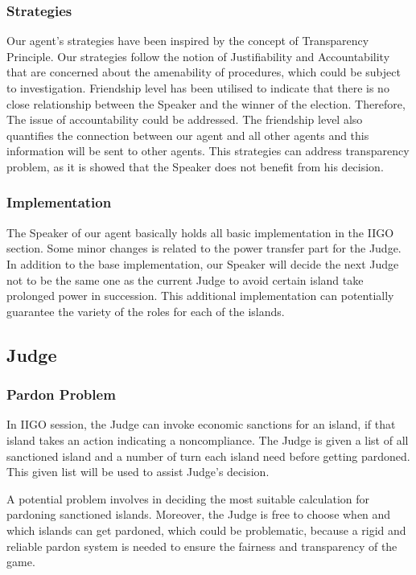 \subsubsection{Strategies} \label{subsubsec:Team6_Speaker:Strategies}
Our agent's strategies have been inspired by the concept of Transparency Principle. Our strategies follow the notion of Justifiability and Accountability that are concerned about the amenability of procedures, which could be subject to investigation. Friendship level has been utilised to indicate that there is no close relationship between the Speaker and the winner of the election. Therefore, The issue of accountability could be addressed. The friendship level also quantifies the connection between our agent and all other agents and this information will be sent to other agents. This strategies can address transparency problem, as it is showed that the Speaker does not benefit from his decision.

\subsubsection{Implementation} \label{subsubsec:Team6_Speaker:Implementation}
The Speaker of our agent basically holds all basic implementation in the IIGO section. Some minor changes is related to the power transfer part for the Judge. In addition to the base implementation, our Speaker will decide the next Judge not to be the same one as the current Judge to avoid certain island take prolonged power in succession. This additional implementation can potentially guarantee the variety of the roles for each of the islands.

\subsection{Judge} \label{subsec:Team6_Judge}
\subsubsection{Pardon Problem} \label{subsubsec:Team6_Judge:Problem}
In IIGO session, the Judge can invoke economic sanctions for an island, if that island takes an action indicating a noncompliance. The Judge is given a list of all sanctioned island and a number of turn each island need before getting pardoned. This given list will be used to assist Judge's decision.

A potential problem involves in deciding the most suitable calculation for pardoning sanctioned islands. Moreover, the Judge is free to choose when and which islands can get pardoned, which could be problematic, because a rigid and reliable pardon system is needed to ensure the fairness and transparency of the game.

